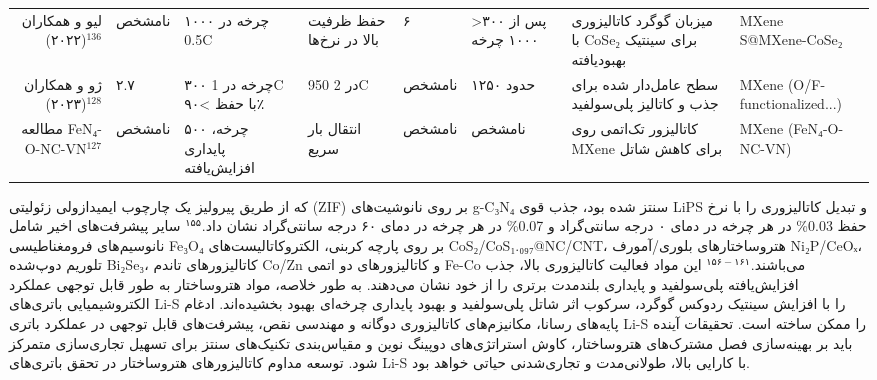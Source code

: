 \documentclass[12pt,a4paper,twocolumn]{article} %
\newcommand{\persian}[1]{\textfarsi{#1}}
\newcommand{\english}[1]{\textenglish{#1}}
\begin{document}
\begin{sidewaystable*}
\begin{tabular}{rllllllll}
        \persian{لیو و همکاران (۲۰۲۲)$^{136}$} & \persian{نامشخص} & \persian{۱۰۰۰ چرخه در \english{0.5C}} & \persian{حفظ ظرفیت بالا در نرخ‌ها} & \persian{۶} & \persian{>۳۰۰ پس از ۱۰۰۰ چرخه} & \persian{میزبان گوگرد کاتالیزوری با \english{CoSe₂} برای سینتیک بهبودیافته} & \english{MXene S@MXene-CoSe₂} \\
        \persian{ژو و همکاران (۲۰۲۳)$^{128}$} & \persian{۲.۷} & \persian{۳۰۰ چرخه در \english{1C} با حفظ >۹۰٪} & \persian{\english{950} در \english{2C}} & \persian{نامشخص} & \persian{حدود ۱۲۵۰} & \persian{سطح عامل‌دار شده برای جذب و کاتالیز پلی‌سولفید} & \english{MXene (O/F-functionalized...)} \\
        \persian{مطالعه \english{FeN₄-O-NC-VN}$^{127}$} & \persian{نامشخص} & \persian{۵۰۰ چرخه، پایداری افزایش‌یافته} & \persian{انتقال بار سریع} & \persian{نامشخص} & \persian{نامشخص} & \persian{کاتالیزور تک‌اتمی روی \english{MXene} برای کاهش شاتل} & \english{MXene (FeN₄-O-NC-VN)} \\
        \bottomrule
    \end{tabular}
\end{sidewaystable*}



\persian{
که از طریق پیرولیز یک چارچوب ایمیدازولی زئولیتی (\english{ZIF}) بر روی نانوشیت‌های \english{g-C₃N₄} سنتز شده بود، جذب قوی \english{LiPS} و تبدیل کاتالیزوری را با نرخ حفظ \english{0.03\%} در هر چرخه در دمای ۰ درجه سانتی‌گراد و \english{0.07\%} در هر چرخه در دمای ۶۰ درجه سانتی‌گراد نشان داد.$^{۱۵۵}$
}
\persian{
سایر پیشرفت‌های اخیر شامل نانوسیم‌های فرومغناطیسی \english{Fe₃O₄} بر روی پارچه کربنی، الکتروکاتالیست‌های \english{CoS₂/CoS₁.₀₉₇@NC/CNT}، هتروساختارهای بلوری/آمورف \english{Ni₂P/CeOₓ}، تلوریم دوپ‌شده \english{Bi₂Se₃}، کاتالیزورهای تاندم \english{Co/Zn} و کاتالیزورهای دو اتمی \english{Fe-Co} می‌باشند.$^{۱۵۶-۱۶۱}$ این مواد فعالیت کاتالیزوری بالا، جذب افزایش‌یافته پلی‌سولفید و پایداری بلندمدت برتری را از خود نشان می‌دهند.
}
\persian{
به طور خلاصه، مواد هتروساختار به طور قابل توجهی عملکرد الکتروشیمیایی باتری‌های \english{Li-S} را با افزایش سینتیک ردوکس گوگرد، سرکوب اثر شاتل پلی‌سولفید و بهبود پایداری چرخه‌ای بهبود بخشیده‌اند. ادغام پایه‌های رسانا، مکانیزم‌های کاتالیزوری دوگانه و مهندسی نقص، پیشرفت‌های قابل توجهی در عملکرد باتری \english{Li-S} را ممکن ساخته است. تحقیقات آینده باید بر بهینه‌سازی فصل مشترک‌های هتروساختار، کاوش استراتژی‌های دوپینگ نوین و مقیاس‌بندی تکنیک‌های سنتز برای تسهیل تجاری‌سازی متمرکز شود. توسعه مداوم کاتالیزورهای هتروساختار در تحقق باتری‌های \english{Li-S} با کارایی بالا، طولانی‌مدت و تجاری‌شدنی حیاتی خواهد بود.
}
\end{document}
